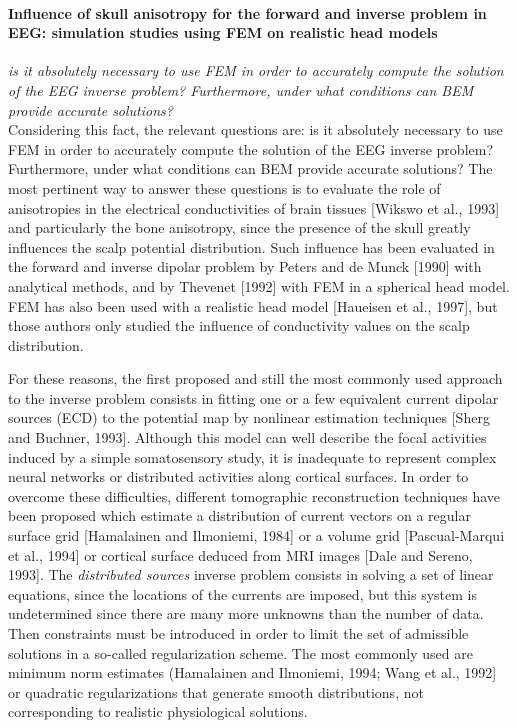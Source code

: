 \paragraph{Influence of skull anisotropy for the forward and inverse problem in EEG: simulation studies using FEM on realistic head models~\cite{pmid9704264}}{

{\it is it absolutely necessary to use FEM in order to accurately compute the solution of the EEG inverse problem? Furthermore, under what conditions can BEM provide accurate solutions?  } \\
Considering this fact, the relevant questions are: is it absolutely necessary to use FEM in order to accurately compute the solution of the EEG inverse problem? Furthermore, under what conditions can BEM provide accurate solutions? The most pertinent way to answer these questions is to evaluate the role of anisotropies in the electrical conductivities of brain tissues [Wikswo et al., 1993] and particularly the bone anisotropy, since the presence of the skull greatly influences the scalp potential distribution. Such influence has been evaluated in the forward and inverse dipolar problem by Peters and de Munck [1990] with analytical methods, and by Thevenet [1992] with FEM in a spherical head model. FEM has also been used with a realistic head model [Haueisen et al., 1997], but those authors only studied the influence of conductivity values on the scalp distribution.




For these reasons, the first proposed and still the most commonly used approach to the inverse problem consists in fitting one or a few equivalent current dipolar sources (ECD) to the potential map by nonlinear estimation techniques [Sherg and Buchner, 1993]. Although this model can well describe the focal activities induced by a simple somatosensory study, it is inadequate to represent complex neural networks or distributed activities along cortical surfaces. In order to overcome these difficulties, different tomographic reconstruction techniques have been proposed which estimate a distribution of current vectors on a regular surface grid [Hamalainen and Ilmoniemi, 1984] or a volume grid [Pascual-Marqui et al., 1994] or cortical surface deduced from MRI images [Dale and Sereno, 1993]. The {\it distributed sources} inverse problem consists in solving a set of linear equations, since the locations of the currents are imposed, but this system is undetermined since there are many more unknowns than the number of data. Then constraints must be introduced in order to limit the set of admissible solutions in a so-called regularization scheme. The most commonly used are minimum norm estimates (Hamalainen and Ilmoniemi, 1994; Wang et al., 1992] or quadratic regularizations that generate smooth distributions, not corresponding to realistic physiological solutions.

}
